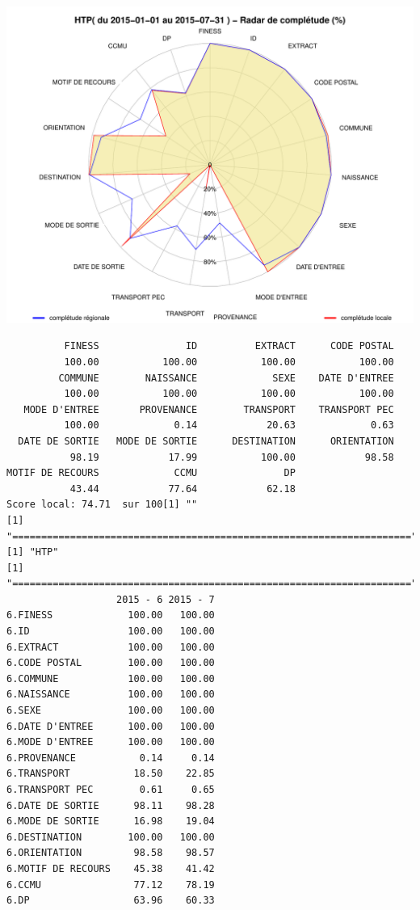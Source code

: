 \documentclass[]{article}
\begin{document}
\includegraphics{completude_files/figure-latex/finess-17.pdf}

\begin{verbatim}
          FINESS               ID          EXTRACT      CODE POSTAL 
          100.00           100.00           100.00           100.00 
         COMMUNE        NAISSANCE             SEXE    DATE D'ENTREE 
          100.00           100.00           100.00           100.00 
   MODE D'ENTREE       PROVENANCE        TRANSPORT    TRANSPORT PEC 
          100.00             0.14            20.63             0.63 
  DATE DE SORTIE   MODE DE SORTIE      DESTINATION      ORIENTATION 
           98.19            17.99           100.00            98.58 
MOTIF DE RECOURS             CCMU               DP 
           43.44            77.64            62.18 
Score local: 74.71  sur 100[1] ""
[1] "====================================================================="
[1] "HTP"
[1] "====================================================================="
                   2015 - 6 2015 - 7
6.FINESS             100.00   100.00
6.ID                 100.00   100.00
6.EXTRACT            100.00   100.00
6.CODE POSTAL        100.00   100.00
6.COMMUNE            100.00   100.00
6.NAISSANCE          100.00   100.00
6.SEXE               100.00   100.00
6.DATE D'ENTREE      100.00   100.00
6.MODE D'ENTREE      100.00   100.00
6.PROVENANCE           0.14     0.14
6.TRANSPORT           18.50    22.85
6.TRANSPORT PEC        0.61     0.65
6.DATE DE SORTIE      98.11    98.28
6.MODE DE SORTIE      16.98    19.04
6.DESTINATION        100.00   100.00
6.ORIENTATION         98.58    98.57
6.MOTIF DE RECOURS    45.38    41.42
6.CCMU                77.12    78.19
6.DP                  63.96    60.33
\end{verbatim}
\end{document}
